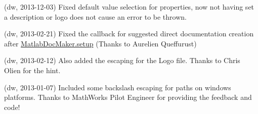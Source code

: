 
\begin{DoxyRefList}
\item[\label{changelog1_5__changelog1_5000001}%
\Hypertarget{changelog1_5__changelog1_5000001}%
Class \hyperlink{class_matlab_doc_maker}{Matlab\+Doc\+Maker} ](dw, 2013-\/12-\/03) Fixed default value selection for properties, now not having set a description or logo does not cause an error to be thrown.

(dw, 2013-\/02-\/21) Fixed the callback for suggested direct documentation creation after \hyperlink{class_matlab_doc_maker_a4ea0d0f724d201bba3448cc579624e35}{Matlab\+Doc\+Maker.\+setup} (Thanks to Aurelien Queffurust)

(dw, 2013-\/02-\/12) Also added the escaping for the Logo file. Thanks to Chris Olien for the hint.

(dw, 2013-\/01-\/07) Included some backslash escaping for paths on windows platforms. Thanks to Math\+Works Pilot Engineer \textquotesingle{} for providing the feedback and code!
\end{DoxyRefList}